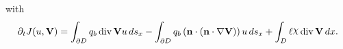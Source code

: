 \documentclass[preview]{standalone}
\let\oldcdot\cdot
\let\cdot\oldcdot
\begin{document}
with
\begin{dmath*}
\partial_{t} J(u,{\mathbf V}) =  \int_{\partial D} q_{b} \operatorname{div} {\mathbf V} u \,ds_x -  \int_{\partial D} q_{b} \left( \mathbf n \cdot \left( \mathbf n \cdot  \nabla {\mathbf V}  \right) \right) u \,ds_x +  \int_{D} \ell \raisebox{\depth}{$\chi$} \operatorname{div} {\mathbf V} \,dx.
 \end{dmath*}
\end{document}
